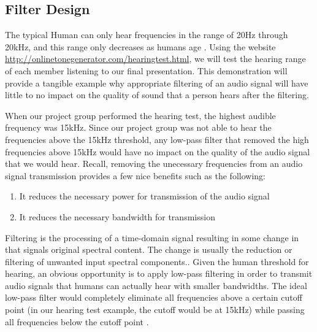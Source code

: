 \subsection{Filter Design}

The typical Human can only hear frequencies in the range of 20Hz
through 20kHz, and this range only decreases as humans age
\cite{human:rg}. Using the website
\url{http://onlinetonegenerator.com/hearingtest.html}, we will
test the hearing range of each member listening to our final
presentation. This demonstration will provide a tangible example
why appropriate filtering of an audio signal will have little to
no impact on the quality of sound that a person hears after the  
filtering.

When our project group performed the hearing test, the highest
audible frequency was 15kHz. Since our project group was not able
to hear the frequencies above the 15kHz threshold, any low-pass
filter that removed the high frequencies above 15kHz would have
no impact on the quality of the audio signal that we would hear.
Recall, removing the unecessary frequencies from an audio signal
transmission provides a few nice benefits such as the following:

\begin{enumerate}
\item It reduces the necessary power for transmission of the audio signal
\item It reduces the necessary bandwidth for transmission
\end{enumerate}

Filtering is the processing of a time-domain signal resulting in
some change in that signals original spectral content. The change
is usually the reduction or filtering of unwanted input spectral
components.\cite{lyons:intro}. Given the human threshold for
hearing, an obvious opportunity is to apply low-pass filtering in
order to transmit audio signals that humans can actually hear
with smaller bandwidths. The ideal low-pass filter would
completely eliminate all frequencies above a certain cutoff point
(in our hearing test example, the cutoff would be at 15kHz) while
passing all frequencies below the cutoff point  
\cite{lowpass:wiki}.

